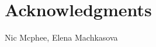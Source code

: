 \documentclass{sig-alternate}
\begin{document}
\section{Acknowledgments}
Nic Mcphee, Elena Machkasova

%

%
%
\end{document}
